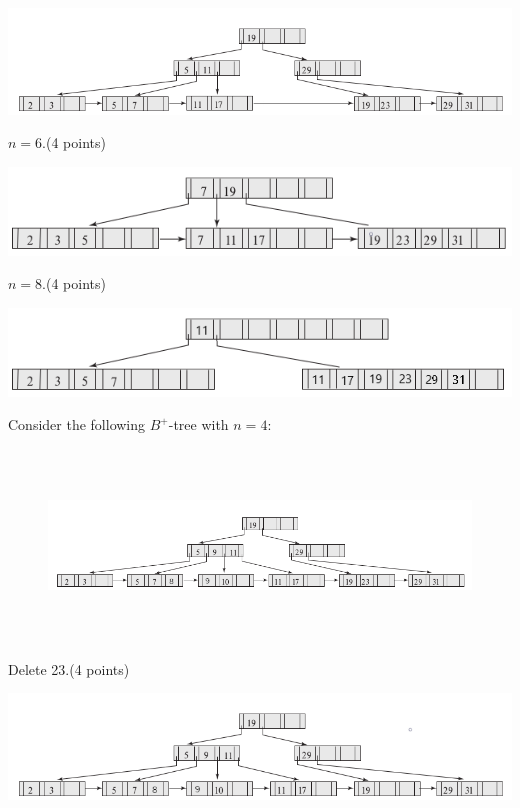 \documentclass[a4 paper]{article}
\begin{document}
{\centering \includegraphics[width=\textwidth/2]{tree-delete - Copy.png}}

 $n = 6$.\indent \indent (4 points)

{\centering \includegraphics[width=\textwidth/2]{tree-insert - Copy.png}}

 $n = 8$.\indent \indent (4 points)

{\centering \includegraphics[width=\textwidth/2]{tree-insert - Copy - Copy.png}}

\newpage

Consider the following $B^{+}$-tree with $n = 4$:
\begin{figure}[h]
\includegraphics[height=2in, width=6in]{tree-delete.png}
\end{figure}

 Delete 23.\indent \indent (4 points)

{\centering \includegraphics[width=\textwidth/2]{tree-delete - Copy (2).png}}
\end{document}
